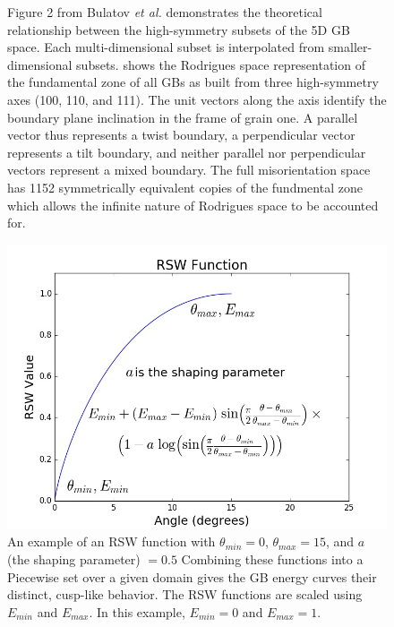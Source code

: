 \documentclass[twoside,senior]{BYUPhys}
\begin{document}
\begin{figure}[ht!]
 \caption[Theoretical relationship between high-symmetry subsets and fundamental zone.]{\label{fig:bulatovFig2}Figure 2 from Bulatov \emph{et al.}\cite{bulatov2014} \protect{} demonstrates the theoretical relationship between the high-symmetry subsets of the 5D GB space.  Each multi-dimensional subset is interpolated from smaller-dimensional subsets. \protect{} shows the Rodrigues space representation of the fundamental zone of all GBs as built from three high-symmetry axes (\textlangle{}100\textrangle{}, \textlangle{}110\textrangle{}, and \textlangle{}111\textrangle{}).  The unit vectors along the axis identify the boundary plane inclination in the frame of grain one.  A parallel vector thus represents a twist boundary, a perpendicular vector represents a tilt boundary, and neither parallel nor perpendicular vectors represent a mixed boundary.  The full misorientation space has 1152 symmetrically equivalent copies of the fundmental zone\cite{bulatov2014,randle2000} which allows the infinite nature of Rodrigues space to be accounted for.}
\end{figure}

\begin{figure}[ht!]
 \centering
 \includegraphics[scale=0.5]{Images/rsw}
 \caption[General form of an RSW function.]{\label{fig:RSW}An example of an RSW function with $\theta_{min} = 0$\textdegree{}, $\theta_{max} = 15$\textdegree{}, and $a$ (the shaping parameter) $= 0.5$  Combining these functions into a Piecewise set over a given domain gives the GB energy curves their distinct, cusp-like behavior.  The RSW functions are scaled using $E_{min}$ and $E_{max}$.  In this example, $E_{min} = 0$ and $E_{max} = 1$.}
\end{figure}
\end{document}
